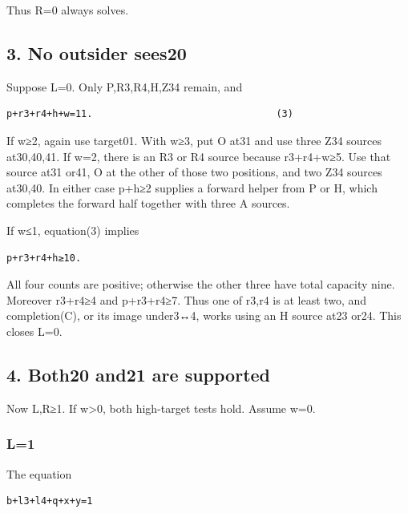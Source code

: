 \documentclass[
  10pt,
]{article}
\begin{document}
Thus R=0 always solves.

\hypertarget{no-outsider-sees20}{%
\subsection*{3. No outsider sees20}\label{no-outsider-sees20}}

Suppose L=0. Only P,R3,R4,H,Z34 remain, and

\begin{verbatim}
p+r3+r4+h+w=11.                                (3)
\end{verbatim}

If w≥2, again use target01. With w≥3, put O at31 and use three
Z34 sources at30,40,41. If w=2, there is an R3 or R4 source because
r3+r4+w≥5. Use that source at31 or41, O at the other of those two
positions, and two Z34 sources at30,40. In either case p+h≥2 supplies a
forward helper from P or H, which completes the forward half together
with three A sources.

If w≤1, equation(3) implies

\begin{verbatim}
p+r3+r4+h≥10.
\end{verbatim}

All four counts are positive; otherwise the other three have total
capacity nine. Moreover r3+r4≥4 and p+r3+r4≥7. Thus one of r3,r4 is at
least two, and completion(C), or its image under3↔4, works using an H
source at23 or24. This closes L=0.

\hypertarget{both20-and21-are-supported}{%
\subsection*{4. Both20 and21 are
supported}\label{both20-and21-are-supported}}

Now L,R≥1. If w\textgreater0, both high-target tests hold. Assume w=0.

\hypertarget{l1}{%
\subsubsection*{L=1}\label{l1}}

The equation

\begin{verbatim}
b+l3+l4+q+x+y=1
\end{verbatim}
\end{document}
